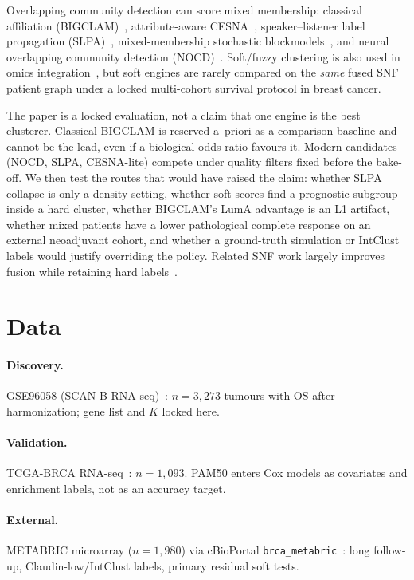 \documentclass[11pt,a4paper]{article}
\begin{document}
Overlapping community detection can score mixed membership: classical affiliation (BIGCLAM)~\cite{ref_bigclam}, attribute-aware CESNA~\cite{ref_cesna}, speaker--listener label propagation (SLPA)~\cite{ref_slpa}, mixed-membership stochastic blockmodels~\cite{ref_mmsb}, and neural overlapping community detection (NOCD)~\cite{ref_nocd}. Soft/fuzzy clustering is also used in omics integration~\cite{ref_fuzzy_hier,ref_ssmf}, but soft engines are rarely compared on the \emph{same} fused SNF patient graph under a locked multi-cohort survival protocol in breast cancer.

The paper is a locked evaluation, not a claim that one engine is the best clusterer. Classical BIGCLAM is reserved a~priori as a comparison baseline and cannot be the lead, even if a biological odds ratio favours it. Modern candidates (NOCD, SLPA, CESNA-lite) compete under quality filters fixed before the bake-off. We then test the routes that would have raised the claim: whether SLPA collapse is only a density setting, whether soft scores find a prognostic subgroup inside a hard cluster, whether BIGCLAM's LumA advantage is an L1 artifact, whether mixed patients have a lower pathological complete response on an external neoadjuvant cohort, and whether a ground-truth simulation or IntClust labels would justify overriding the policy. Related SNF work largely improves fusion while retaining hard labels~\cite{ref_absnf,ref_misssnf,ref_icluf}.

\section{Data}

\paragraph{Discovery.} GSE96058 (SCAN-B RNA-seq)~\cite{ref_scanb,ref_saal}: $n=3{,}273$ tumours with OS after harmonization; gene list and $K$ locked here.

\paragraph{Validation.} TCGA-BRCA RNA-seq~\cite{ref_tcga,ref_tcga_pancan}: $n=1{,}093$. PAM50 enters Cox models as covariates and enrichment labels, not as an accuracy target.

\paragraph{External.} METABRIC microarray ($n=1{,}980$) via cBioPortal \texttt{brca\_metabric}~\cite{ref_metabric,ref_cbioportal,ref_intclust}: long follow-up, Claudin-low/IntClust labels, primary residual soft tests.
\end{document}
